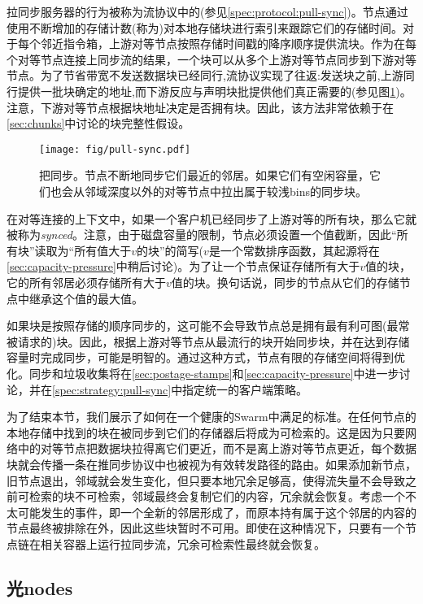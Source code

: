 拉同步服务器的行为被称为流协议中的(参见\ref{spec:protocol:pull-sync})。节点通过使用不断增加的存储计数(称为)对本地存储块进行索引来跟踪它们的存储时间。对于每个邻近指令箱，上游对等节点按照存储时间戳的降序顺序提供流块。作为在每个对等节点连接上同步流的结果，一个块可以从多个上游对等节点同步到下游对等节点。为了节省带宽不发送数据块已经同行,流协议实现了往返:发送块之前,上游同行提供一批块确定的地址,而下游反应与声明块批提供他们真正需要的(参见图\ref{fig:pull-syncing})。注意，下游对等节点根据块地址决定是否拥有块。因此，该方法非常依赖于在\ref{sec:chunks}中讨论的块完整性假设。


\begin{figure}[htbp]
   \centering
   \texttt{[image: fig/pull-sync.pdf]}
   \caption[把同步\statusgreen]{把同步。节点不断地同步它们最近的邻居。如果它们有空闲容量，它们也会从邻域深度以外的对等节点中拉出属于较浅bins的同步块。}
   \label{fig:pull-syncing}
\end{figure}

在对等连接的上下文中，如果一个客户机已经同步了上游对等的所有块，那么它就被称为\emph{synced}。注意，由于磁盘容量的限制，节点必须设置一个值截断，因此“所有块”读取为“所有值大于$v$的块”的简写($v$是一个常数排序函数，其起源将在\ref{sec:capacity-pressure}中稍后讨论)。为了让一个节点保证存储所有大于$v$值的块，它的所有邻居必须存储所有大于$v$值的块。换句话说，同步的节点从它们的存储节点中继承这个值的最大值。 

如果块是按照存储的顺序同步的，这可能不会导致节点总是拥有最有利可图(最常被请求的)块。因此，根据上游对等节点从最流行的块开始同步块，并在达到存储容量时完成同步，可能是明智的。通过这种方式，节点有限的存储空间将得到优化。同步和垃圾收集将在\ref{sec:postage-stamps}和\ref{sec:capacity-pressure}中进一步讨论，并在\ref{spec:strategy:pull-sync}中指定统一的客户端策略。

为了结束本节，我们展示了如何在一个健康的Swarm中满足的标准。在任何节点的本地存储中找到的块在被同步到它们的存储器后将成为可检索的。这是因为只要网络中的对等节点把数据块拉得离它们更近，而不是离上游对等节点更近，每个数据块就会传播一条在推同步协议中也被视为有效转发路径的路由。如果添加新节点，旧节点退出，邻域就会发生变化，但只要本地冗余足够高，使得流失量不会导致之前可检索的块不可检索，邻域最终会复制它们的内容，冗余就会恢复。考虑一个不太可能发生的事件，即一个全新的邻居形成了，而原本持有属于这个邻居的内容的节点最终被排除在外，因此这些块暂时不可用。即使在这种情况下，只要有一个节点链在相关容器上运行拉同步流，冗余可检索性最终就会恢复。

\subsection{光nodes\statusgreen}
\label{sec:light}

